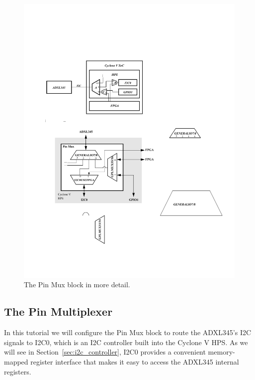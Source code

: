 \documentclass[11pt, twoside, pdftex]{article}
\begin{document}
\begin{figure} [h]
\begin{center}
\includegraphics[scale = 1.0]{figures/fig_pinmux.pdf}
\end{center}
\caption{The Pin Mux block in more detail.}
\label{fig:pin_mux}
\end{figure}

\subsection{The Pin Multiplexer}
\label{sec:pinmux_background}

In this tutorial we will configure the Pin Mux block to route the ADXL345's I2C signals to I2C0, which is an I2C controller built into the Cyclone V HPS. As we will see in Section~\ref{sec:i2c_controller}, I2C0 provides a convenient memory-mapped register interface that makes it easy to access the ADXL345 internal registers.
\end{document}
